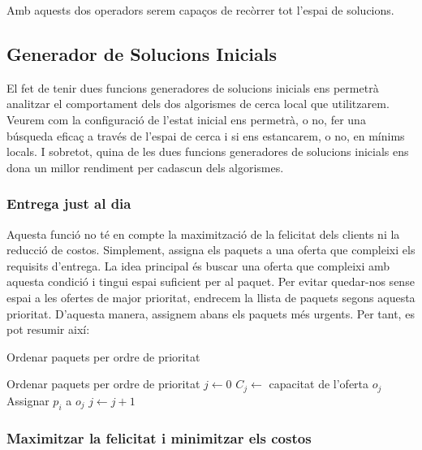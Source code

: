 \documentclass[a4paper]{article}
\begin{document}
	Amb aquests dos operadors serem capaços de recòrrer tot l'espai de solucions.
	
	
	\subsection{Generador de Solucions Inicials}
	
	El fet de tenir dues funcions generadores de solucions inicials ens permetrà analitzar el comportament dels dos algorismes de cerca local que utilitzarem. Veurem com la configuració de l'estat inicial ens permetrà, o no, fer una búsqueda eficaç a través de l'espai de cerca i si ens estancarem, o no, en mínims locals. I sobretot, quina de les dues funcions generadores de solucions inicials ens dona un millor rendiment per cadascun dels algorismes. \\
	
	\subsubsection{Entrega just al dia}
	
	Aquesta funció no té en compte la maximització de la felicitat dels clients ni la reducció de costos. Simplement, assigna els paquets a una oferta que compleixi els requisits d'entrega. La idea principal és buscar una oferta que compleixi amb aquesta condició i tingui espai suficient per al paquet. Per evitar quedar-nos sense espai a les ofertes de major prioritat, endrecem la llista de paquets segons aquesta prioritat. D'aquesta manera, assignem abans els paquets més urgents. Per tant, es pot resumir així:
	
	\begin{algorithm} [H]
		\caption{Ordenar paquets per ordre de prioritat}
		\begin{algorithmic}[1]
			\State Ordenar paquets per ordre de prioritat
			\State $j \gets 0$
			\State $C_j \gets$ capacitat de l'oferta $o_j$
			\State Assignar $p_i$ a $o_j$
			\Else
			\State $j \gets j + 1$ 
			\EndIf
			\EndWhile
			\EndFor
		\end{algorithmic}
	\end{algorithm}
	
	
	\subsubsection{Maximitzar la felicitat i minimitzar els costos}
	
\end{document}
